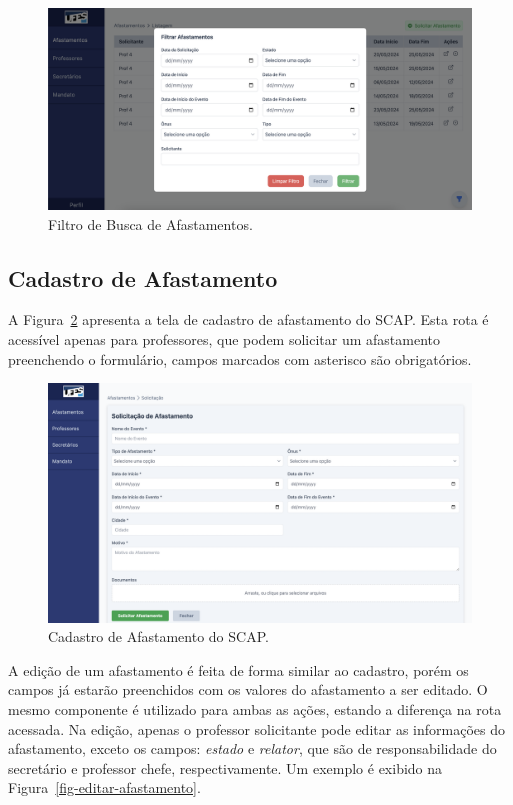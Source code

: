 \begin{figure}[h!]
    \centering
    \includegraphics[width=\textwidth]{figuras/prints-app/fig-filtro-afastamento.png}
    \caption{Filtro de Busca de Afastamentos.}
    \label{fig-filtro-afastamentos}
\end{figure}

\subsection{Cadastro de Afastamento}
\label{subsec-projeto-cadastro-afastamento}

A Figura~\ref{fig-cadastro-afastamento} apresenta a tela de cadastro de afastamento do SCAP. Esta rota
é acessível apenas para professores, que podem solicitar um afastamento preenchendo o formulário,
campos marcados com asterisco são obrigatórios. 

\begin{figure}[h!]
    \centering
    \includegraphics[width=\textwidth]{figuras/prints-app/fig-solicitar-afastamento.png}
    \caption{Cadastro de Afastamento do SCAP.}
    \label{fig-cadastro-afastamento}
\end{figure}

A edição de um afastamento é feita de forma similar ao cadastro, porém os campos já estarão preenchidos com os valores
do afastamento a ser editado. O mesmo componente é utilizado para ambas as ações, estando a diferença na rota acessada.
Na edição, apenas o professor solicitante pode editar as informações do afastamento, exceto os campos:
\textit{estado} e \textit{relator}, que são de responsabilidade do secretário e professor chefe, respectivamente. Um exemplo é exibido na Figura~\ref{fig-editar-afastamento}.

